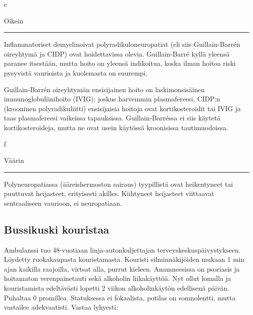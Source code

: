 \documentclass[
]{book}
\begin{document}
e

Oikein

\begin{center}\rule{0.5\linewidth}{0.5pt}\end{center}

Inflammatoriset demyelinoivat polyradikuloneuropatiat (eli siis Guillain-Barrén oireyhtymä ja CIDP) ovat hoidettavissa olevia. Guillain-Barré kyllä yleensä paranee itsestään, mutta hoito on yleensä indikoitua, koska ilman hoitoa riski pysyvistä vaurioista ja kuolemasta on suurempi.

Guillain-Barrén oireyhtymän ensisijainen hoito on laskimonsisäinen immunoglobuliinihoito (IVIG); joskus harvemmin plasmafereesi. CIDP:n (krooninen polyradikuliitti) ensisijaisia hoitoja ovat kortikosteroidit tai IVIG ja taas plasmafereesi vaikeissa tapauksissa. Guillain-Barréssa ei siis käytetä kortikosteroideja, mutta ne ovat usein käytössä kroonisissa tautimuodoissa.

f

Väärin

\begin{center}\rule{0.5\linewidth}{0.5pt}\end{center}

Polyneuropatiassa (ääreishermoston sairaus) tyypillistä ovat heikentyneet tai puuttuvat heijasteet, erityisesti akilles. Kiihtyneet heijasteet viittaavat sentraaliseen vaurioon, ei neuropatiaan.

\subsection{Bussikuski kouristaa}\label{bussikuski-kouristaa}

Ambulanssi tuo 48-vuotiaan linja-autonkuljettajan terveyskeskuspäivystykseen. Löydetty ruokakaupasta kouristamasta. Kouristi silminnäkijöiden mukaan 1 min ajan kaikilla raajoilla, virtsat alla, purrut kieleen. Anamneesissa on psoriasis ja hoitamaton verenpainetauti sekä alkoholin liikakäyttöä. Nyt ollut lomalla ja kouristamista edeltävästi lopetti 2 viikon alkoholinkäytön edellisenä päivän. Puhaltaa 0 promillea. Statuksessa ei fokaalista, potilas on somnolentti, mutta vastailee adekvaatisti. Vastaa lyhyesti:
\end{document}
